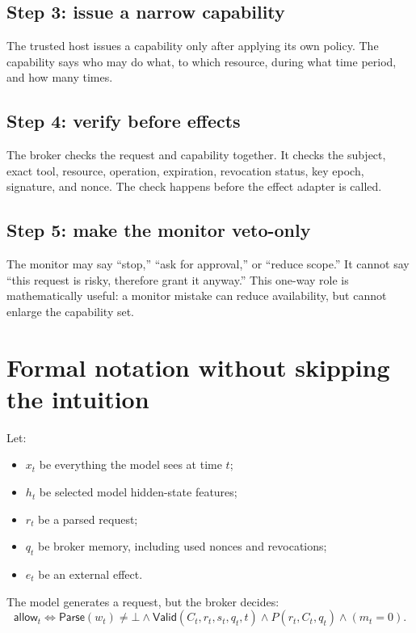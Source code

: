 \documentclass[11pt]{article}
\begin{document}
\subsection{Step 3: issue a narrow capability}
The trusted host issues a capability only after applying its own policy. The capability says who may do what, to which resource, during what time period, and how many times.

\subsection{Step 4: verify before effects}
The broker checks the request and capability together. It checks the subject, exact tool, resource, operation, expiration, revocation status, key epoch, signature, and nonce. The check happens before the effect adapter is called.

\subsection{Step 5: make the monitor veto-only}
The monitor may say ``stop,'' ``ask for approval,'' or ``reduce scope.'' It cannot say ``this request is risky, therefore grant it anyway.'' This one-way role is mathematically useful: a monitor mistake can reduce availability, but cannot enlarge the capability set.

\section{Formal notation without skipping the intuition}

Let:
\begin{itemize}
  \item $x_t$ be everything the model sees at time $t$;
  \item $h_t$ be selected model hidden-state features;
  \item $r_t$ be a parsed request;
  \item $q_t$ be broker memory, including used nonces and revocations;
  \item $e_t$ be an external effect.
\end{itemize}

The model generates a request, but the broker decides:
\begin{equation}
 \textsf{allow}_t \iff
 \textsf{Parse}(w_t)\neq\bot
 \land \textsf{Valid}(C_t,r_t,s_t,q_t,t)
 \land P(r_t,C_t,q_t)
 \land (m_t=0).
 \label{eq:decision}
\end{equation}
\end{document}
